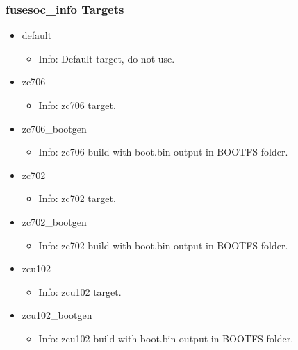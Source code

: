 \subsubsection{fusesoc\_info Targets}
\begin{itemize}
\item default
	\begin{itemize}
	\item[$\space$] Info: Default target, do not use.
	\end{itemize}
\item zc706
	\begin{itemize}
	\item[$\space$] Info: zc706 target.
	\end{itemize}
\item zc706\_bootgen
	\begin{itemize}
	\item[$\space$] Info: zc706 build with boot.bin output in BOOTFS folder.
	\end{itemize}
\item zc702
	\begin{itemize}
	\item[$\space$] Info: zc702 target.
	\end{itemize}
\item zc702\_bootgen
	\begin{itemize}
	\item[$\space$] Info: zc702 build with boot.bin output in BOOTFS folder.
	\end{itemize}
\item zcu102
	\begin{itemize}
	\item[$\space$] Info: zcu102 target.
	\end{itemize}
\item zcu102\_bootgen
	\begin{itemize}
	\item[$\space$] Info: zcu102 build with boot.bin output in BOOTFS folder.
	\end{itemize}
\end{itemize}
